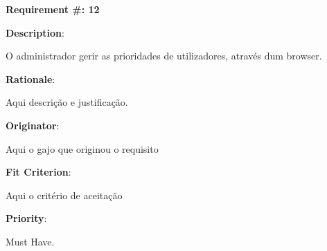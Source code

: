 \pagebreak






\begin{minipage}{0.55\textwidth}
\begin{flushleft}\textbf{Requirement \#: 12}\end{flushleft}
\end{minipage}
\begin{minipage}{0.4\textwidth}
\end{minipage}

\begin{description}
\item \textbf{Description}:

O administrador gerir as prioridades de utilizadores, através dum browser.


\item \textbf{Rationale}:

Aqui descrição e justificação. \\
\item \textbf{Originator}:

Aqui o gajo que originou o requisito\\

\item \textbf{Fit Criterion}:

Aqui o critério de aceitação \\

\item \textbf{Priority}:

Must Have. \\

\end{description}

\pagebreak



